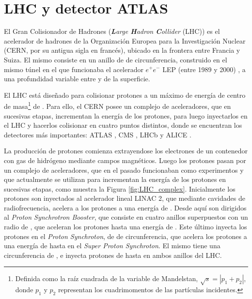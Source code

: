 \chapter{LHC y detector ATLAS}




El Gran Colisionador de Hadrones (\textit{\textbf{L}arge \textbf{H}adron \textbf{C}ollider} (LHC)) \cite{Evans:1129806} es el acelerador de hadrones de la Organización Europea para la Investigación Nuclear (CERN, por su antigua sigla en francés), ubicado en la frontera entre Francia y Suiza. El mismo consiste en un anillo de  de circunferencia, construido en el mismo túnel en el que funcionaba el acelerador $e^{+}e^{-}$ LEP (entre 1989 y 2000) \cite{LEPbook}, a una profundidad variable entre  y  de la superficie.

El LHC está diseñado para colisionar protones a un máximo de energía de centro de masa\footnote{Definida como la raíz cuadrada de la variable de Mandelstan, $\sqrt{s}=|p_1+p_2|$, donde $p_1$ y $p_2$ representan los cuadrimomentos de las partículas incidentes.} de . Para ello, el CERN posee un complejo de aceleradores, que en sucesivas etapas, incrementan la energía de los protones, para luego inyectarlos en el LHC y hacerlos colisionar en cuatro puntos distintos, donde se encuentran los detectores más importantes: ATLAS \cite{PERF-2007-01}, CMS \cite{CMS}, LHCb \cite{LHCb} y ALICE \cite{ALICE}.

La producción de protones comienza extrayendose los electrones de un contenedor con gas de hidrógeno mediante campos magnéticos. Luego los protones pasan por un complejo de aceleradores, que en el pasado funcionaban como experimentos y que actualmente se utilizan para incrementan la energía de los protones en sucesivas etapas, como muestra la Figura \ref{fig:LHC_complex}. Inicialmente los protones son inyectados al acelerador lineal LINAC 2, que mediante cavidades de radiofrecuencia, acelera a los protones a una energía de . Desde aquí son dirigidos al \textit{Proton Synchrotron Booster}, que consiste en cuatro anillos superpuestos con un radio de , que aceleran los protones hasta una energía de . Este último inyecta los protones en el \textit{Proton Synchroton}, de  de circunferencia, que acelera los protones a una energía de hasta  en el \textit{Super Proton Synchroton}. El mismo tiene una circunferencia de , e inyecta protones de hasta  en ambos anillos del LHC. 

